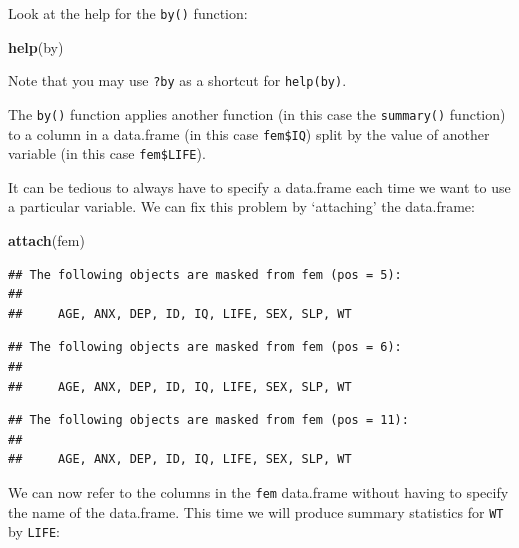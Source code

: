 \documentclass[12pt,]{book}
\newenvironment{Shaded}{\begin{snugshade}}{\end{snugshade}}
\newcommand{\KeywordTok}[1]{\textcolor[rgb]{0.13,0.29,0.53}{\textbf{#1}}}
\newcommand{\OperatorTok}[1]{\textcolor[rgb]{0.81,0.36,0.00}{\textbf{#1}}}
\newcommand{\NormalTok}[1]{#1}
\theoremstyle{definition}
\theoremstyle{definition}
\theoremstyle{definition}
\theoremstyle{remark}
\begin{document}
\begin{Shaded}
\end{Shaded}

Look at the help for the \texttt{by()} function:

\begin{Shaded}
\begin{Highlighting}[]
\KeywordTok{help}\NormalTok{(by)}
\end{Highlighting}
\end{Shaded}

Note that you may use \texttt{?by} as a shortcut for \texttt{help(by)}.

The \texttt{by()} function applies another function (in this case the
\texttt{summary()} function) to a column in a data.frame (in this case
\texttt{fem\$IQ}) split by the value of another variable (in this case
\texttt{fem\$LIFE}).

It can be tedious to always have to specify a data.frame each time we
want to use a particular variable. We can fix this problem by
`attaching' the data.frame:

\begin{Shaded}
\begin{Highlighting}[]
\KeywordTok{attach}\NormalTok{(fem)}
\end{Highlighting}
\end{Shaded}

\begin{verbatim}
## The following objects are masked from fem (pos = 5):
## 
##     AGE, ANX, DEP, ID, IQ, LIFE, SEX, SLP, WT
\end{verbatim}

\begin{verbatim}
## The following objects are masked from fem (pos = 6):
## 
##     AGE, ANX, DEP, ID, IQ, LIFE, SEX, SLP, WT
\end{verbatim}

\begin{verbatim}
## The following objects are masked from fem (pos = 11):
## 
##     AGE, ANX, DEP, ID, IQ, LIFE, SEX, SLP, WT
\end{verbatim}

We can now refer to the columns in the \texttt{fem} data.frame without
having to specify the name of the data.frame. This time we will produce
summary statistics for \texttt{WT} by \texttt{LIFE}:
\end{document}

